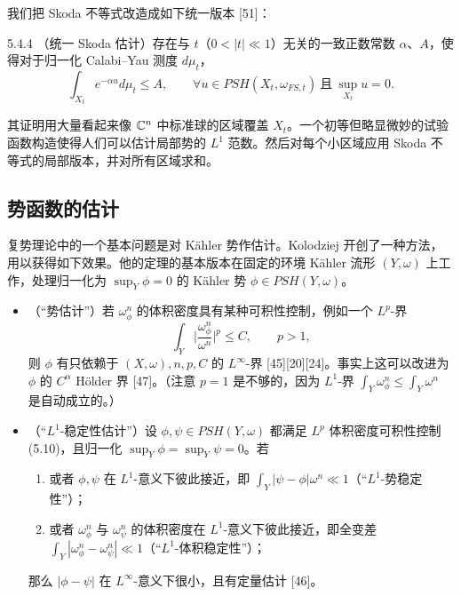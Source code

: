 我们把 Skoda 不等式改造成如下统一版本 [51]：

\begin{theorem}{5.4.4}
（统一 Skoda 估计）存在与 $t$（$0<|t|\ll1$）无关的一致正数常数 $\alpha$、$A$，使得对于归一化 Calabi--Yau 测度 $d\mu_t$，
\[
\int_{X_t}e^{-\alpha u}d\mu_t\le A,\qquad \forall u\in PSH(X_t,\omega_{FS,t})\ \text{且}\ \sup_{X_t}u=0.
\]
\end{theorem}


其证明用大量看起来像 $\mathbb{C}^n$ 中标准球的区域覆盖 $X_t$。一个初等但略显微妙的试验函数构造使得人们可以估计局部势的 $L^1$ 范数。然后对每个小区域应用 Skoda 不等式的局部版本，并对所有区域求和。

\subsection{势函数的估计}

复势理论中的一个基本问题是对 Kähler 势作估计。Kolodziej 开创了一种方法，用以获得如下效果。他的定理的基本版本在固定的环境 Kähler 流形 $(Y,\omega)$ 上工作，处理归一化为 $\sup_Y\phi=0$ 的 Kähler 势 $\phi\in PSH(Y,\omega)$。
\begin{itemize}
\item （“势估计”）若 $\omega_\phi^n$ 的体积密度具有某种可积性控制，例如一个 $L^p$-界
\begin{equation}
\int_Y\Big|\frac{\omega_\phi^n}{\omega^n}\Big|^p\le C,\qquad p>1, \tag{5.10}
\end{equation}
则 $\phi$ 有只依赖于 $(X,\omega),n,p,C$ 的 $L^\infty$-界 [45][20][24]。事实上这可以改进为 $\phi$ 的 $C^\alpha$ Hölder 界 [47]。（注意 $p=1$ 是不够的，因为 $L^1$-界 $\int_Y\omega_\phi^n\le\int_Y\omega^n$ 是自动成立的。）
\item （“$L^1$-稳定性估计”）设 $\phi,\psi\in PSH(Y,\omega)$ 都满足 $L^p$ 体积密度可积性控制 (5.10)，且归一化 $\sup_Y\phi=\sup_Y\psi=0$。若
\begin{enumerate}
\item 或者 $\phi,\psi$ 在 $L^1$-意义下彼此接近，即 $\int_Y|\psi-\phi|\omega^n\ll1$（“$L^1$-势稳定性”）；
\item 或者 $\omega_\phi^n$ 与 $\omega_\psi^n$ 的体积密度在 $L^1$-意义下彼此接近，即全变差 $\int_Y|\omega_\phi^n-\omega_\psi^n|\ll1$（“$L^1$-体积稳定性”）；
\end{enumerate}
那么 $|\phi-\psi|$ 在 $L^\infty$-意义下很小，且有定量估计 [46]。
\end{itemize}

